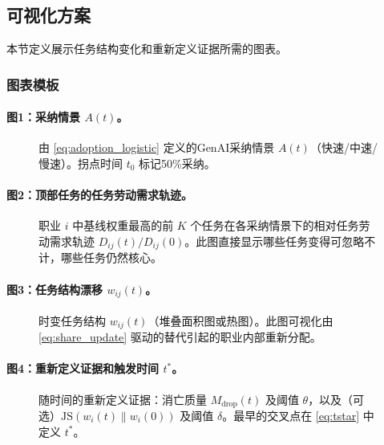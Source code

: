 \subsection{可视化方案}
\label{sec:viz_plan}
本节定义展示任务结构变化和重新定义证据所需的图表。

\subsubsection{图表模板}
\label{sec:fig_templates}

\paragraph{图1：采纳情景 $A(t)$。}
\begin{figure}[ht]
\centering
\caption{由 \eqref{eq:adoption_logistic} 定义的GenAI采纳情景 $A(t)$（快速/中速/慢速）。拐点时间 $t_0$ 标记50\%采纳。}
\label{fig:adoption}
\end{figure}

\paragraph{图2：顶部任务的任务劳动需求轨迹。}
\begin{figure}[ht]
\centering
\caption{职业 $i$ 中基线权重最高的前 $K$ 个任务在各采纳情景下的相对任务劳动需求轨迹 $D_{ij}(t)/D_{ij}(0)$。此图直接显示哪些任务变得可忽略不计，哪些任务仍然核心。}
\label{fig:task_demand_top}
\end{figure}

\paragraph{图3：任务结构漂移 $w_{ij}(t)$。}
\begin{figure}[ht]
\centering
\caption{时变任务结构 $w_{ij}(t)$（堆叠面积图或热图）。此图可视化由 \eqref{eq:share_update} 驱动的替代引起的职业内部重新分配。}
\label{fig:task_structure}
\end{figure}

\paragraph{图4：重新定义证据和触发时间 $t^*$。}
\begin{figure}[ht]
\centering
\caption{随时间的重新定义证据：消亡质量 $M_{\text{drop}}(t)$ 及阈值 $\theta$，以及（可选）$\mathrm{JS}(w_i(t)\|w_i(0))$ 及阈值 $\delta$。最早的交叉点在 \eqref{eq:tstar} 中定义 $t^*$。}
\label{fig:redefinition_trigger}
\end{figure}

